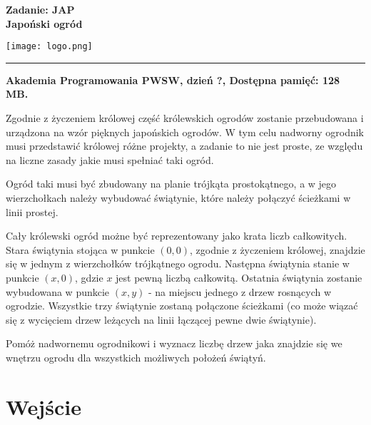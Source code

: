 \documentclass[10pt]{article}
\begin{document}
    

    \noindent
    \begin{minipage}{0.5\textwidth}
        \LARGE{\textsf{\textbf{Zadanie: JAP\\Japoński ogród}}}
    \end{minipage}
    \begin{minipage}{0.5\textwidth}
        \begin{flushright}
            \texttt{[image: logo.png]}
        \end{flushright}
    \end{minipage}
    
    \noindent\rule{\textwidth}{0.4pt}
    
    \noindent\textbf{Akademia Programowania PWSW, dzień ?, Dostępna pamięć: 128 MB.}
    \vspace{1em}
    
    
    \noindent
    Zgodnie z życzeniem królowej część królewskich ogrodów zostanie przebudowana i urządzona na wzór pięknych japońskich ogrodów. W tym celu nadworny ogrodnik musi przedstawić królowej różne projekty, a zadanie to nie jest proste, ze względu na liczne zasady jakie musi spełniać taki ogród. 
    
    Ogród taki musi być zbudowany na planie trójkąta prostokątnego, a w jego wierzchołkach należy wybudować świątynie, które należy połączyć ścieżkami w linii prostej.
    
    Cały królewski ogród możne być reprezentowany jako krata liczb całkowitych. Stara świątynia stojąca w punkcie $(0, 0)$, zgodnie z życzeniem królowej, znajdzie się w jednym z wierzchołków trójkątnego ogrodu. Następna świątynia stanie w punkcie $(x, 0)$, gdzie $x$ jest pewną liczbą całkowitą. Ostatnia świątynia zostanie wybudowana w punkcie $(x, y)$ - na miejscu jednego z drzew rosnących w ogrodzie. Wszystkie trzy świątynie zostaną połączone ścieżkami (co może wiązać się z wycięciem drzew leżących na linii łączącej pewne dwie świątynie).
    
    Pomóż nadwornemu ogrodnikowi i wyznacz liczbę drzew jaka znajdzie się we wnętrzu ogrodu dla wszystkich możliwych położeń świątyń.


    \section*{Wejście}
    
\end{document}
